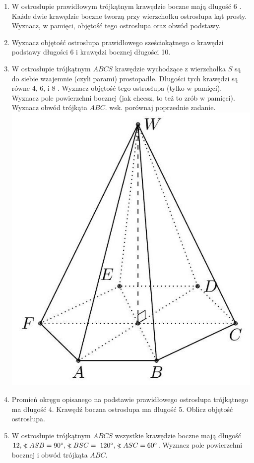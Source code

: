 \documentclass[10pt]{article}
\newcommand\Varangle{\mathop{{<\!\!\!\!\!\text{\small)}}\:}\nolimits}
\begin{document}
\begin{enumerate}
  \item W ostrosłupie prawidłowym trójkątnym krawędzie boczne mają długość 6 . Każde dwie krawędzie boczne tworzą przy wierzchołku ostrosłupa kąt prosty. Wyznacz, w pamięci, objętość tego ostrosłupa oraz obwód podstawy.
  \item Wyznacz objętość ostrosłupa prawidłowego sześciokątnego o krawędzi podstawy długości 6 i krawędzi bocznej długości 10.
  \item W ostrosłupie trójkątnym \(A B C S\) krawędzie wychodzące z wierzchołka \(S\) są do siebie wzajemnie (czyli parami) prostopadłe. Długości tych krawędzi są równe 4, 6, i 8 . Wyznacz objętość tego ostrosłupa (tylko w pamięci). Wyznacz pole powierzchni bocznej (jak chcesz, to też to zrób w pamięci). Wyznacz obwód trójkąta \(A B C\). wsk. porównaj poprzednie zadanie.\\
\includegraphics[max width=\textwidth, center]{2024_11_21_e9b4faa005d5be2cc318g-088(1)}
  \item Promień okręgu opisanego na podstawie prawidłowego ostrosłupa trójkątnego ma długość 4. Krawędź boczna ostrosłupa ma długość 5. Oblicz objętość ostrosłupa.
  \item W ostrosłupie trójkątnym \(A B C S\) wszystkie krawędzie boczne mają długość \(12, \Varangle A S B=90^{\circ}, \Varangle B S C=\) \(120^{\circ}, \Varangle A S C=60^{\circ}\). Wyznacz pole powierzchni bocznej i obwód trójkąta \(A B C\).\\

\end{enumerate}
\end{document}
